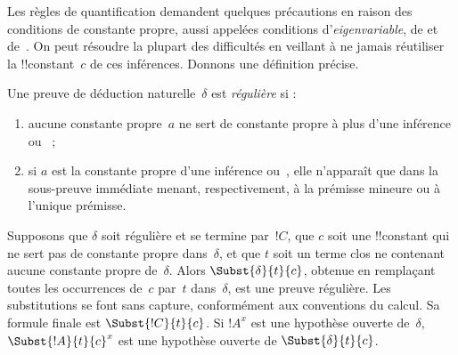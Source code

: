 \documentclass[../../../include/open-logic-section]{subfiles}
\begin{document}


Les règles de quantification demandent quelques précautions en raison
des conditions de constante propre, aussi appelées conditions
d'\emph{eigenvariable}, de \Elim{\lexists} et de~\Intro{\lforall}.
On peut résoudre la plupart des difficultés en veillant à ne jamais
réutiliser la !!{constant}~$c$ de ces inférences. Donnons une définition
précise.

\begin{defn}
Une preuve de déduction naturelle~$\delta$ est \emph{régulière} si :
\begin{enumerate}
\item aucune constante propre~$a$ ne sert de constante propre à
plus d'une inférence \Elim{\lexists} ou~\Intro{\lforall} ;
\item si $a$ est la constante propre d'une inférence
\Elim{\lexists} ou~\Intro{\lforall}, elle n'apparaît que dans la
sous-preuve immédiate menant, respectivement, à la prémisse mineure
ou à l'unique prémisse.
\end{enumerate}
\end{defn}

\begin{lem}
Supposons que $\delta$ soit régulière et se termine par~$!C$,
que $c$ soit une !!{constant} qui ne sert pas de constante propre
dans~$\delta$, et que $t$ soit un terme clos ne contenant aucune
constante propre de~$\delta$. Alors $\Subst{\delta}{t}{c}$,
obtenue en remplaçant toutes les occurrences de~$c$ par~$t$
dans~$\delta$, est une preuve régulière. Les substitutions
se font sans capture, conformément aux conventions du calcul.
Sa formule finale est $\Subst{!C}{t}{c}$.
Si $!A^x$ est une hypothèse ouverte de~$\delta$,
$\Subst{!A}{t}{c}^x$ est une hypothèse ouverte de
$\Subst{\delta}{t}{c}$.
\end{lem}
\end{document}
